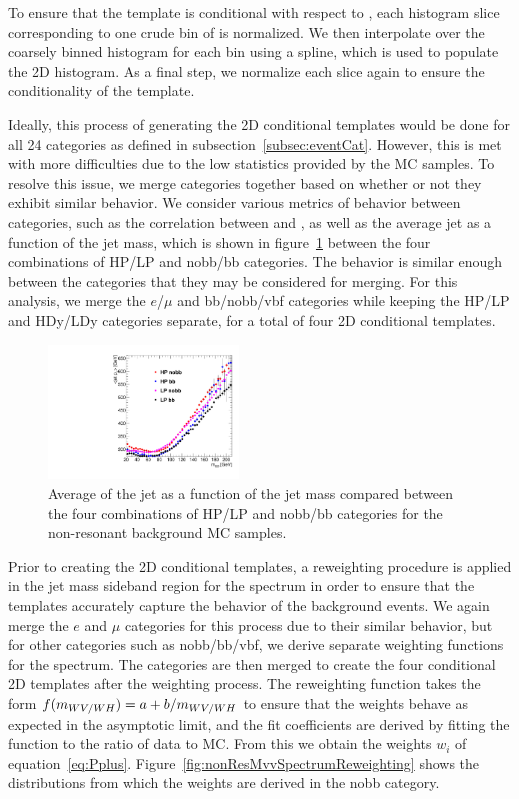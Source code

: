 To ensure that the template is conditional with respect to \MJ, each histogram slice corresponding to one crude bin of \MJ is normalized.
We then interpolate over the coarsely binned \MJ histogram for each \MVV bin using a spline, which is used to populate the 2D histogram.
As a final step, we normalize each \MJ slice again to ensure the conditionality of the template.

Ideally, this process of generating the 2D conditional templates would be done for all 24 categories as defined in subsection~\ref{subsec:eventCat}.
However, this is met with more difficulties due to the low statistics provided by the MC samples.
To resolve this issue, we merge categories together based on whether or not they exhibit similar behavior.
We consider various metrics of behavior between categories, such as the correlation between \MJ and \MVV, as well as the average jet \pt as a function of the jet mass, which is shown in figure~\ref{fig:nonRes2DCorr} between the four combinations of HP/LP and nobb/bb categories.
The behavior is similar enough between the categories that they may be considered for merging.
For this analysis, we merge the $e$/$\mu$ and bb/nobb/vbf categories while keeping the HP/LP and HDy/LDy categories separate, for a total of four 2D conditional templates.

\begin{figure}[htbp]
  \centering
  \includegraphics[width=0.45\textwidth]{fig/2Dfit/nonRes_corr.pdf}
  \caption{
    Average \pt of the jet as a function of the jet mass \MJ compared between the four combinations of HP/LP and nobb/bb categories for the non-resonant background MC samples.
  }
  \label{fig:nonRes2DCorr}
\end{figure}

Prior to creating the 2D conditional templates, a reweighting procedure is applied in the jet mass sideband region for the \MVV spectrum in order to ensure that the templates accurately capture the behavior of the background events.
We again merge the $e$ and $\mu$ categories for this process due to their similar behavior, but for other categories such as nobb/bb/vbf, we derive separate weighting functions for the \MVV spectrum.
The categories are then merged to create the four conditional 2D templates after the weighting process.
The reweighting function takes the form $f(m_{WV/WH})=a+b/m_{WV/WH}$ to ensure that the weights behave as expected in the asymptotic limit, and the fit coefficients are derived by fitting the function to the ratio of data to MC.
From this we obtain the weights $w_i$ of equation~\ref{eq:Pplus}.
Figure~\ref{fig:nonResMvvSpectrumReweighting} shows the \MVV distributions from which the weights are derived in the nobb category.

